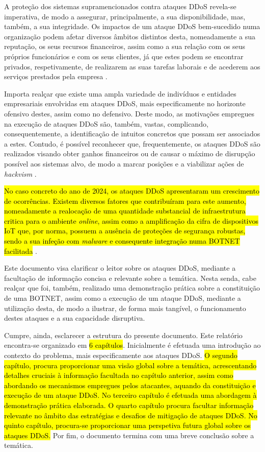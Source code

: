 A proteção dos sistemas supramencionados contra ataques DDoS revela-se imperativa, de modo a assegurar, principalmente, a sua disponibilidade, mas, também, a sua integridade. Os impactos de um ataque DDoS bem-sucedido numa organização podem afetar diversos âmbitos distintos desta, nomeadamente a sua reputação, os seus recursos financeiros, assim como a sua relação com os seus próprios funcionários e com os seus clientes, já que estes podem se encontrar privados, respetivamente, de realizarem as suas tarefas laborais e de acederem aos serviços prestados pela empresa \cite{kaspersky_how_ddos_works}.


Importa realçar que existe uma ampla variedade de indivíduos e entidades empresariais envolvidas em ataques DDoS, mais especificamente no horizonte ofensivo destes, assim como no defensivo. Deste modo, as motivações empregues na execução de ataques DDoS são, também, vastas, complicando, consequentemente, a identificação de intuitos concretos que possam ser associados a estes. Contudo, é possível reconhecer que, frequentemente, os ataques DDoS são realizados visando obter ganhos financeiros ou de causar o máximo de disrupção possível aos sistemas alvo, de modo a marcar posições e a viabilizar ações de \textit{hackvism} \cite{fortinet_what_is_ddos}.

\hl{No caso concreto do ano de 2024, os ataques DDoS apresentaram um crescimento de ocorrências. Existem diversos fatores que contribuíram para este aumento, nomeadamente a realocação de uma quantidade substancial de infraestrutura critica para o ambiente \textit{online}, assim como a amplificação da cifra de dispositivos IoT que, por norma, possuem a ausência de proteções de segurança robustas, sendo a sua infeção com \textit{malware} e consequente integração numa BOTNET facilitada} \cite{arnold_rise_2024}.

Este documento visa clarificar o leitor sobre os ataques DDoS, mediante a facultação de informação concisa e relevante sobre a temática. Nesta senda, cabe realçar que foi, também, realizado uma demonstração prática sobre a constituição de uma BOTNET, assim como a execução de um ataque DDoS, mediante a utilização desta, de modo a ilustrar, de forma mais tangível, o funcionamento destes ataques e a sua capacidade disruptiva.

Cumpre, ainda, esclarecer a estrutura do presente documento. Este relatório encontra-se organizado em \hl{6 capítulos}. Inicialmente é efetuada uma introdução ao contexto do problema, mais especificamente aos ataques DDoS. \hl{O segundo capítulo, procura proporcionar uma visão global sobre a temática, acrescentando detalhes cruciais à informação facultada no capítulo anterior, assim como abordando os mecanismos empregues pelos atacantes, aquando da constituição e execução de um ataque DDoS. No terceiro capítulo é efetuada uma abordagem à demonstração prática elaborada. O quarto capítulo procura facultar informação relevante no âmbito das estratégias e desafios de mitigação de ataques DDoS. No quinto capítulo, procura-se proporcionar uma perspetiva futura global sobre os ataques DDoS.} Por fim, o documento termina com uma breve conclusão sobre a temática.